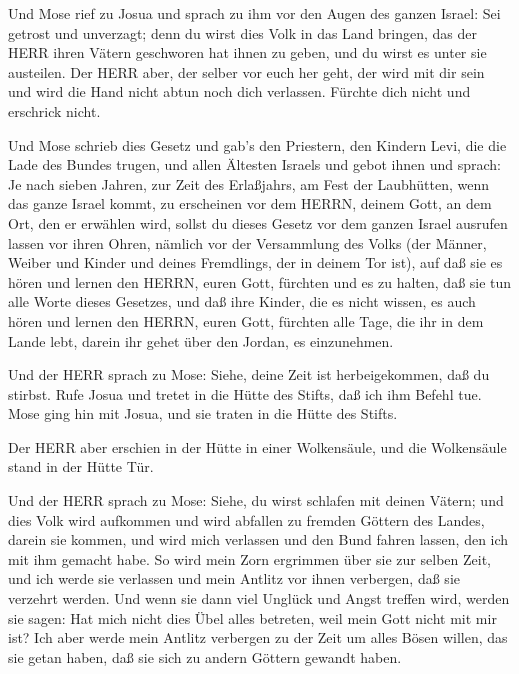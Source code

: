  Und Mose rief zu Josua und sprach zu ihm vor den Augen des
ganzen Israel: Sei getrost und unverzagt; denn du wirst dies Volk in das
Land bringen, das der HERR ihren Vätern geschworen hat ihnen zu geben,
und du wirst es unter sie austeilen.  Der HERR aber, der
selber vor euch her geht, der wird mit dir sein und wird die Hand nicht
abtun noch dich verlassen. Fürchte dich nicht und erschrick nicht.

 Und Mose schrieb dies Gesetz und gab's den Priestern, den
Kindern Levi, die die Lade des Bundes trugen, und allen Ältesten Israels
 und gebot ihnen und sprach: Je nach sieben Jahren, zur
Zeit des Erlaßjahrs, am Fest der Laubhütten,  wenn das
ganze Israel kommt, zu erscheinen vor dem HERRN, deinem Gott, an dem
Ort, den er erwählen wird, sollst du dieses Gesetz vor dem ganzen Israel
ausrufen lassen vor ihren Ohren,  nämlich vor der
Versammlung des Volks (der Männer, Weiber und Kinder und deines
Fremdlings, der in deinem Tor ist), auf daß sie es hören und lernen den
HERRN, euren Gott, fürchten und es zu halten, daß sie tun alle Worte
dieses Gesetzes,  und daß ihre Kinder, die es nicht wissen,
es auch hören und lernen den HERRN, euren Gott, fürchten alle Tage, die
ihr in dem Lande lebt, darein ihr gehet über den Jordan, es einzunehmen.

 Und der HERR sprach zu Mose: Siehe, deine Zeit ist
herbeigekommen, daß du stirbst. Rufe Josua und tretet in die Hütte des
Stifts, daß ich ihm Befehl tue. Mose ging hin mit Josua, und sie traten
in die Hütte des Stifts.

 Der HERR aber erschien in der Hütte in einer Wolkensäule,
und die Wolkensäule stand in der Hütte Tür.

 Und der HERR sprach zu Mose: Siehe, du wirst schlafen mit
deinen Vätern; und dies Volk wird aufkommen und wird abfallen zu fremden
Göttern des Landes, darein sie kommen, und wird mich verlassen und den
Bund fahren lassen, den ich mit ihm gemacht habe.  So wird
mein Zorn ergrimmen über sie zur selben Zeit, und ich werde sie
verlassen und mein Antlitz vor ihnen verbergen, daß sie verzehrt werden.
Und wenn sie dann viel Unglück und Angst treffen wird, werden sie sagen:
Hat mich nicht dies Übel alles betreten, weil mein Gott nicht mit mir
ist?  Ich aber werde mein Antlitz verbergen zu der Zeit um
alles Bösen willen, das sie getan haben, daß sie sich zu andern Göttern
gewandt haben.

